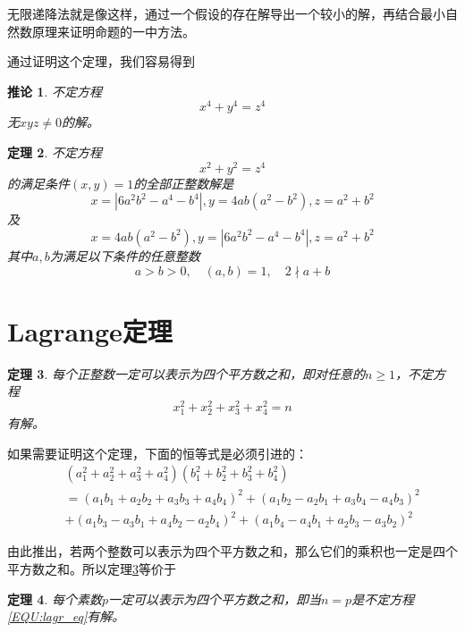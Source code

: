 \documentclass{ctexrep}
\newcommand{\aabs}[1]{{ \left| #1 \right| }}
\newtheorem{thrm}{定理}[section]
\newtheorem{coro}[thrm]{推论}
\begin{document}
无限递降法就是像这样，通过一个假设的存在解导出一个较小的解，再结合最小自然数原理来证明命题的一中方法。

通过证明这个定理，我们容易得到

\begin{coro}
不定方程
\begin{equation}
x^4+y^4=z^4
\end{equation}
无$xyz\neq 0$的解。
\end{coro}

\begin{thrm}
不定方程
\begin{displaymath}
x^2+y^2=z^4
\end{displaymath}
的满足条件$(x,y)=1$的全部正整数解是
\begin{displaymath}
x=\aabs{6a^2b^2-a^4-b^4},y=4ab(a^2-b^2),z=a^2+b^2
\end{displaymath}
及
\begin{displaymath}
x=4ab(a^2-b^2),y=\aabs{6a^2b^2-a^4-b^4},z=a^2+b^2
\end{displaymath}
其中$a,b$为满足以下条件的任意整数
\begin{displaymath}
a>b>0,\quad (a,b)=1,\quad 2\nmid a+b
\end{displaymath}
\end{thrm}

\section{Lagrange定理}
\begin{thrm}\label{THRM:lagrange}
每个正整数一定可以表示为四个平方数之和，即对任意的$n\geq 1$，不定方程
\begin{equation}\label{EQU:lagr_eq}
x_1^2+x_2^2+x_3^2+x_4^2=n
\end{equation}
有解。
\end{thrm}

如果需要证明这个定理，下面的恒等式是必须引进的：
\begin{eqnarray*}
&&(a_1^2+a_2^2+a_3^2+a_4^2)(b_1^2+b_2^2+b_3^2+b_4^2)\\
&&=(a_1b_1+a_2b_2+a_3b_3+a_4b_4)^2+(a_1b_2-a_2b_1+a_3b_4-a_4b_3)^2\\
&&+(a_1b_3-a_3b_1+a_4b_2-a_2b_4)^2+(a_1b_4-a_4b_1+a_2b_3-a_3b_2)^2
\end{eqnarray*}

由此推出，若两个整数可以表示为四个平方数之和，那么它们的乘积也一定是四个平方数之和。所以定理\ref{THRM:lagrange}等价于

\begin{thrm}
每个素数$p$一定可以表示为四个平方数之和，即当$n=p$是不定方程\ref{EQU:lagr_eq}有解。
\end{thrm}
\end{document}
